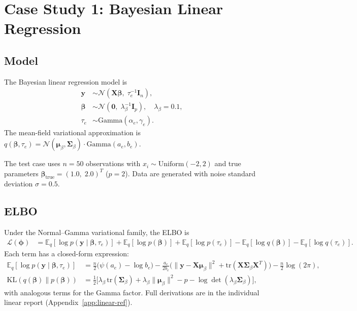 \documentclass[11pt,a4paper]{article}
\newcommand{\E}{\mathbb{E}}
\newcommand{\N}{\mathcal{N}}
\newcommand{\tr}{\text{tr}}
\begin{document}
\section{Case Study 1: Bayesian Linear Regression}
\label{sec:linear}

\subsection{Model}

The Bayesian linear regression model is
\begin{align}
  \bm{y} &\sim \N(\bm{X}\bm{\beta},\; \tau_e^{-1}\bm{I}_n), \\
  \bm{\beta} &\sim \N(\bm{0},\; \lambda_\beta^{-1}\bm{I}_p), \quad \lambda_\beta = 0.1, \\
  \tau_e &\sim \mathrm{Gamma}(\alpha_e, \gamma_e).
\end{align}
The mean-field variational approximation is
$q(\bm{\beta},\tau_e) = \N(\bm{\mu}_\beta,\bm{\Sigma}_\beta)\cdot\mathrm{Gamma}(a_e,b_e)$.

The test case uses $n=50$ observations with $x_i \sim \mathrm{Uniform}(-2,2)$ and
true parameters $\bm{\beta}_{\mathrm{true}} = (1.0,\; 2.0)^T$ ($p=2$).
Data are generated with noise standard deviation $\sigma=0.5$.

\subsection{ELBO}

Under the Normal--Gamma variational family, the ELBO is
\begin{align}
  \mathcal{L}(\bm{\phi})
  &= \E_q[\log p(\bm{y}\mid\bm{\beta},\tau_e)]
   + \E_q[\log p(\bm{\beta})]
   + \E_q[\log p(\tau_e)]
   - \E_q[\log q(\bm{\beta})]
   - \E_q[\log q(\tau_e)].
\end{align}
Each term has a closed-form expression:
\begin{align}
  \E_q[\log p(\bm{y}\mid\bm{\beta},\tau_e)]
  &= \frac{n}{2}\bigl(\psi(a_e)-\log b_e\bigr)
    - \frac{a_e}{2b_e}\bigl(
        \lVert\bm{y}-\bm{X}\bm{\mu}_\beta\rVert^2
        + \tr(\bm{X}\bm{\Sigma}_\beta\bm{X}^T)
      \bigr)
    - \frac{n}{2}\log(2\pi),\\
  \mathrm{KL}(q(\bm{\beta})\|p(\bm{\beta}))
  &= \tfrac{1}{2}\bigl[
      \lambda_\beta\,\tr(\bm{\Sigma}_\beta)
      + \lambda_\beta\lVert\bm{\mu}_\beta\rVert^2
      - p
      - \log\det(\lambda_\beta\bm{\Sigma}_\beta)
    \bigr],
\end{align}
with analogous terms for the Gamma factor.
Full derivations are in the individual linear report (Appendix~\ref{app:linear-ref}).
\end{document}
